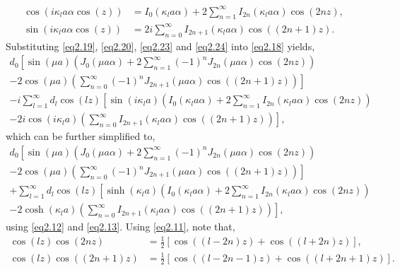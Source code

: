 \documentclass[aip,graphicx]{revtex4-1}
\newcommand{\lr}[1]{\left(#1\right)}
\newcommand{\lrsq}[1]{\left[ #1 \right]}
\newcommand{\besj}[2]{J_{#1}\lr{#2}}
\newcommand{\besi}[2]{I_{#1}\lr{#2}}
\begin{document}
    \begin{align}
        \cos\lr{i\kappa_l a \alpha\cos\lr{z}}&=\besi{0}{\kappa_l a \alpha}+2\sum_{n=1}^{\infty}\besi{2n}{\kappa_l a \alpha}\cos\lr{2nz},\label{eq2.23}\\
        \sin\lr{i\kappa_l a \alpha\cos\lr{z}}&=2i\sum_{n=0}^{\infty}\besi{2n+1}{\kappa_l a \alpha}\cos\lr{\lr{2n+1}z}.\label{eq2.24}
    \end{align}
Substituting \eqref{eq2.19}, \eqref{eq2.20}, \eqref{eq2.23} and \eqref{eq2.24} into \eqref{eq2.18} yields,
    \begin{multline}
        d_0\left[\sin\lr{\mu a}\lr{\besj{0}{\mu a \alpha}+2\sum_{n=1}^{\infty}\lr{-1}^n\besj{2n}{\mu a \alpha}\cos\lr{2nz}}\right.\\
        \left.-2\cos\lr{\mu a}\lr{\sum_{n=0}^{\infty}\lr{-1}^n\besj{2n+1}{\mu a \alpha}\cos\lr{\lr{2n+1}z}}\right]\\
        -i\sum_{l=1}^{\infty}d_l\cos\lr{lz}\left[\sin\lr{i\kappa_l a}\lr{\besi{0}{\kappa_l a \alpha}+2\sum_{n=1}^{\infty}\besi{2n}{\kappa_l a \alpha}\cos\lr{2nz}}\right.\\
        \left.-2i\cos\lr{i\kappa_l a}\lr{\sum_{n=0}^{\infty}\besi{2n+1}{\kappa_l a \alpha}\cos\lr{\lr{2n+1}z}}\right],
    \end{multline}
        which can be further simplified to,
         \begin{multline}
        d_0\left[\sin\lr{\mu a}\lr{\besj{0}{\mu a \alpha}+2\sum_{n=1}^{\infty}\lr{-1}^n\besj{2n}{\mu a \alpha}\cos\lr{2nz}}\right.\\
        \left.-2\cos\lr{\mu a}\lr{\sum_{n=0}^{\infty}\lr{-1}^n\besj{2n+1}{\mu a \alpha}\cos\lr{\lr{2n+1}z}}\right]\\
        +\sum_{l=1}^{\infty}d_l\cos\lr{lz}\left[\sinh\lr{\kappa_l a}\lr{\besi{0}{\kappa_l a \alpha}+2\sum_{n=1}^{\infty}\besi{2n}{\kappa_l a \alpha}\cos\lr{2nz}}\right.\\
        \left.-2\cosh\lr{\kappa_l a}\lr{\sum_{n=0}^{\infty}\besi{2n+1}{\kappa_l a \alpha}\cos\lr{\lr{2n+1}z}}\right],\label{eq2.25}
    \end{multline}
    using \eqref{eq2.12} and \eqref{eq2.13}.
Using \eqref{eq2.11}, note that,
    \begin{align}
        \cos\lr{lz}\cos\lr{2nz}&=\frac{1}{2}\lrsq{\cos\lr{\lr{l-2n}z}+\cos\lr{\lr{l+2n}z}},\label{eq2.26}\\
        \cos\lr{lz}\cos\lr{\lr{2n+1}z}&=\frac{1}{2}\lrsq{\cos\lr{\lr{l-2n-1}z}+\cos\lr{\lr{l+2n+1}z}}.\label{eq2.27}
    \end{align}
\end{document}
